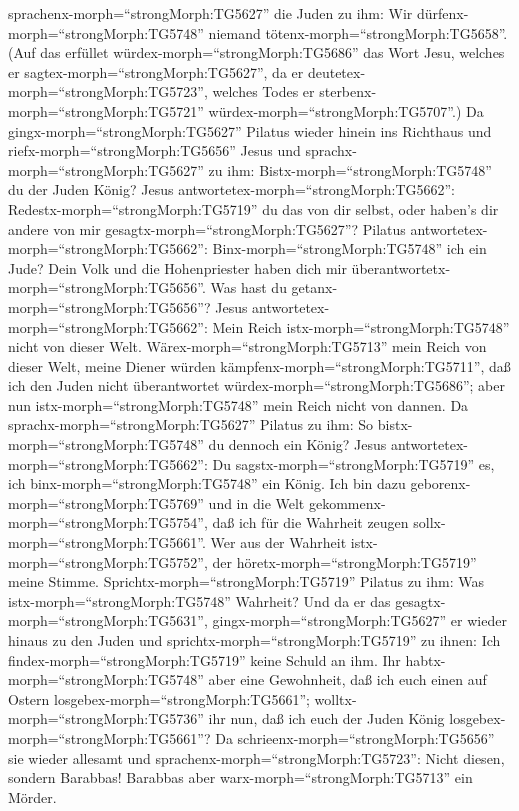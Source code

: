 sprachenx-morph=``strongMorph:TG5627'' die Juden zu ihm: Wir
dürfenx-morph=``strongMorph:TG5748'' niemand
tötenx-morph=``strongMorph:TG5658''.  (Auf das erfüllet
würdex-morph=``strongMorph:TG5686'' das Wort Jesu, welches er
sagtex-morph=``strongMorph:TG5627'', da er
deutetex-morph=``strongMorph:TG5723'', welches Todes er
sterbenx-morph=``strongMorph:TG5721''
würdex-morph=``strongMorph:TG5707''.)  Da
gingx-morph=``strongMorph:TG5627'' Pilatus wieder hinein ins Richthaus
und riefx-morph=``strongMorph:TG5656'' Jesus und
sprachx-morph=``strongMorph:TG5627'' zu ihm:
Bistx-morph=``strongMorph:TG5748'' du der Juden König? 
Jesus antwortetex-morph=``strongMorph:TG5662'':
Redestx-morph=``strongMorph:TG5719'' du das von dir selbst, oder haben's
dir andere von mir gesagtx-morph=``strongMorph:TG5627''? 
Pilatus antwortetex-morph=``strongMorph:TG5662'':
Binx-morph=``strongMorph:TG5748'' ich ein Jude? Dein Volk und die
Hohenpriester haben dich mir
überantwortetx-morph=``strongMorph:TG5656''. Was hast du
getanx-morph=``strongMorph:TG5656''?  Jesus
antwortetex-morph=``strongMorph:TG5662'': Mein Reich
istx-morph=``strongMorph:TG5748'' nicht von dieser Welt.
Wärex-morph=``strongMorph:TG5713'' mein Reich von dieser Welt, meine
Diener würden kämpfenx-morph=``strongMorph:TG5711'', daß ich den Juden
nicht überantwortet würdex-morph=``strongMorph:TG5686''; aber nun
istx-morph=``strongMorph:TG5748'' mein Reich nicht von dannen.
 Da sprachx-morph=``strongMorph:TG5627'' Pilatus zu ihm: So
bistx-morph=``strongMorph:TG5748'' du dennoch ein König? Jesus
antwortetex-morph=``strongMorph:TG5662'': Du
sagstx-morph=``strongMorph:TG5719'' es, ich
binx-morph=``strongMorph:TG5748'' ein König. Ich bin dazu
geborenx-morph=``strongMorph:TG5769'' und in die Welt
gekommenx-morph=``strongMorph:TG5754'', daß ich für die Wahrheit zeugen
sollx-morph=``strongMorph:TG5661''. Wer aus der Wahrheit
istx-morph=``strongMorph:TG5752'', der
höretx-morph=``strongMorph:TG5719'' meine Stimme. 
Sprichtx-morph=``strongMorph:TG5719'' Pilatus zu ihm: Was
istx-morph=``strongMorph:TG5748'' Wahrheit? Und da er das
gesagtx-morph=``strongMorph:TG5631'', gingx-morph=``strongMorph:TG5627''
er wieder hinaus zu den Juden und sprichtx-morph=``strongMorph:TG5719''
zu ihnen: Ich findex-morph=``strongMorph:TG5719'' keine Schuld an ihm.
 Ihr habtx-morph=``strongMorph:TG5748'' aber eine
Gewohnheit, daß ich euch einen auf Ostern
losgebex-morph=``strongMorph:TG5661'';
wolltx-morph=``strongMorph:TG5736'' ihr nun, daß ich euch der Juden
König losgebex-morph=``strongMorph:TG5661''?  Da
schrieenx-morph=``strongMorph:TG5656'' sie wieder allesamt und
sprachenx-morph=``strongMorph:TG5723'': Nicht diesen, sondern Barabbas!
Barabbas aber warx-morph=``strongMorph:TG5713'' ein Mörder.

